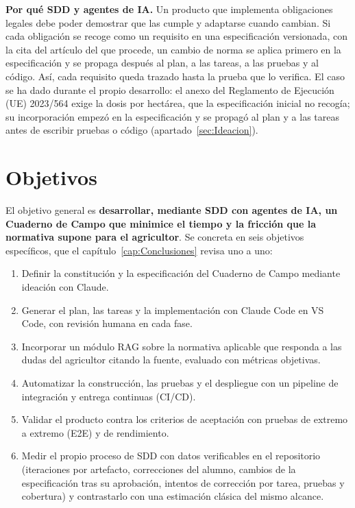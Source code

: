 \textbf{Por qué SDD y agentes de IA.} Un producto que implementa obligaciones legales debe poder demostrar que las cumple y adaptarse cuando cambian. Si cada obligación se recoge como un requisito en una especificación versionada, con la cita del artículo del que procede, un cambio de norma se aplica primero en la especificación y se propaga después al plan, a las tareas, a las pruebas y al código. Así, cada requisito queda trazado hasta la prueba que lo verifica. El caso se ha dado durante el propio desarrollo: el anexo del Reglamento de Ejecución (UE) 2023/564 exige la dosis por hectárea, que la especificación inicial no recogía; su incorporación empezó en la especificación y se propagó al plan y a las tareas antes de escribir pruebas o código (apartado~\ref{sec:Ideacion}).

\section{Objetivos}\label{sec:Objetivos}

El objetivo general es \textbf{desarrollar, mediante SDD con agentes de IA, un Cuaderno de Campo que minimice el tiempo y la fricción que la normativa supone para el agricultor}. Se concreta en seis objetivos específicos, que el capítulo~\ref{cap:Conclusiones} revisa uno a uno:

\begin{enumerate}[label=\textbf{O\arabic*.}, leftmargin=*]
	\item Definir la constitución y la especificación del Cuaderno de Campo mediante ideación con Claude.
	\item Generar el plan, las tareas y la implementación con Claude Code en VS Code, con revisión humana en cada fase.
	\item Incorporar un módulo RAG sobre la normativa aplicable que responda a las dudas del agricultor citando la fuente, evaluado con métricas objetivas.
	\item Automatizar la construcción, las pruebas y el despliegue con un pipeline de integración y entrega continuas (CI/CD).
	\item Validar el producto contra los criterios de aceptación con pruebas de extremo a extremo (E2E) y de rendimiento.
	\item Medir el propio proceso de SDD con datos verificables en el repositorio (iteraciones por artefacto, correcciones del alumno, cambios de la especificación tras su aprobación, intentos de corrección por tarea, pruebas y cobertura) y contrastarlo con una estimación clásica del mismo alcance.
\end{enumerate}

